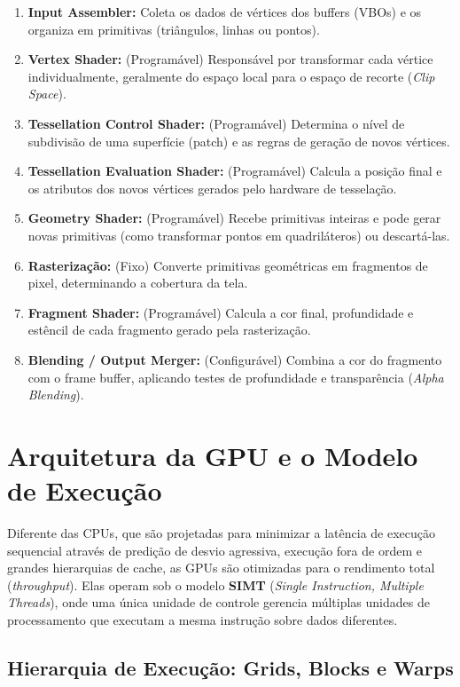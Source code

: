 \begin{enumerate}
    \item \textbf{Input Assembler:} Coleta os dados de vértices dos buffers (VBOs) e os organiza em primitivas (triângulos, linhas ou pontos).
    \item \textbf{Vertex Shader:} (Programável) Responsável por transformar cada vértice individualmente, geralmente do espaço local para o espaço de recorte (\textit{Clip Space}).
    \item \textbf{Tessellation Control Shader:} (Programável) Determina o nível de subdivisão de uma superfície (patch) e as regras de geração de novos vértices.
    \item \textbf{Tessellation Evaluation Shader:} (Programável) Calcula a posição final e os atributos dos novos vértices gerados pelo hardware de tesselação.
    \item \textbf{Geometry Shader:} (Programável) Recebe primitivas inteiras e pode gerar novas primitivas (como transformar pontos em quadriláteros) ou descartá-las.
    \item \textbf{Rasterização:} (Fixo) Converte primitivas geométricas em fragmentos de pixel, determinando a cobertura da tela.
    \item \textbf{Fragment Shader:} (Programável) Calcula a cor final, profundidade e estêncil de cada fragmento gerado pela rasterização.
    \item \textbf{Blending / Output Merger:} (Configurável) Combina a cor do fragmento com o frame buffer, aplicando testes de profundidade e transparência (\textit{Alpha Blending}).
\end{enumerate}

\section{Arquitetura da GPU e o Modelo de Execução}

Diferente das CPUs, que são projetadas para minimizar a latência de execução sequencial através de predição de desvio agressiva, execução fora de ordem e grandes hierarquias de cache, as GPUs são otimizadas para o rendimento total (\textit{throughput}). Elas operam sob o modelo \textbf{SIMT} (\textit{Single Instruction, Multiple Threads}), onde uma única unidade de controle gerencia múltiplas unidades de processamento que executam a mesma instrução sobre dados diferentes.

\subsection{Hierarquia de Execução: Grids, Blocks e Warps}

